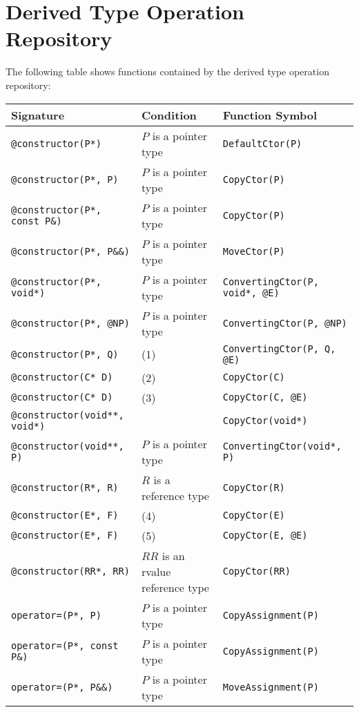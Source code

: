 \documentclass[a4paper,oneside,11pt]{book}
\theoremstyle{definition}
\begin{document}
\section{Derived Type Operation Repository}

The following table shows functions contained by the derived type operation repository:

\begin{flushleft}
\begin{supertabular}{lll}
\textbf{Signature}& \textbf{Condition}& \textbf{Function Symbol}\\
\hline
\verb|@constructor(P*)|& $P$ is a pointer type& \verb|DefaultCtor(P)|\\
\verb|@constructor(P*, P)|& $P$ is a pointer type& \verb|CopyCtor(P)|\\
\verb|@constructor(P*, const P&)|& $P$ is a pointer type& \verb|CopyCtor(P)|\\
\verb|@constructor(P*, P&&)|& $P$ is a pointer type & \verb|MoveCtor(P)|\\
\verb|@constructor(P*, void*)|& $P$ is a pointer type & \verb|ConvertingCtor(P, void*, @E)|\\
\verb|@constructor(P*, @NP)|& $P$ is a pointer type & \verb|ConvertingCtor(P, @NP)|\\
\verb|@constructor(P*, Q)|& (1)& \verb|ConvertingCtor(P, Q, @E)|\\
\verb|@constructor(C* D)|& (2)& \verb|CopyCtor(C)|\\
\verb|@constructor(C* D)|& (3)& \verb|CopyCtor(C, @E)|\\
\verb|@constructor(void**, void*)|& & \verb|CopyCtor(void*)|\\
\verb|@constructor(void**, P)|& $P$ is a pointer type & \verb|ConvertingCtor(void*, P)|\\
\verb|@constructor(R*, R)|& $R$ is a reference type& \verb|CopyCtor(R)|\\
\verb|@constructor(E*, F)|& (4)& \verb|CopyCtor(E)|\\
\verb|@constructor(E*, F)|& (5)& \verb|CopyCtor(E, @E)|\\
\verb|@constructor(RR*, RR)|& $RR$ is an rvalue reference type& \verb|CopyCtor(RR)|\\
\verb|operator=(P*, P)|& $P$ is a pointer type& \verb|CopyAssignment(P)|\\
\verb|operator=(P*, const P&)|& $P$ is a pointer type& \verb|CopyAssignment(P)|\\
\verb|operator=(P*, P&&)|& $P$ is a pointer type& \verb|MoveAssignment(P)|\\

\end{supertabular}
\end{flushleft}
\end{document}
